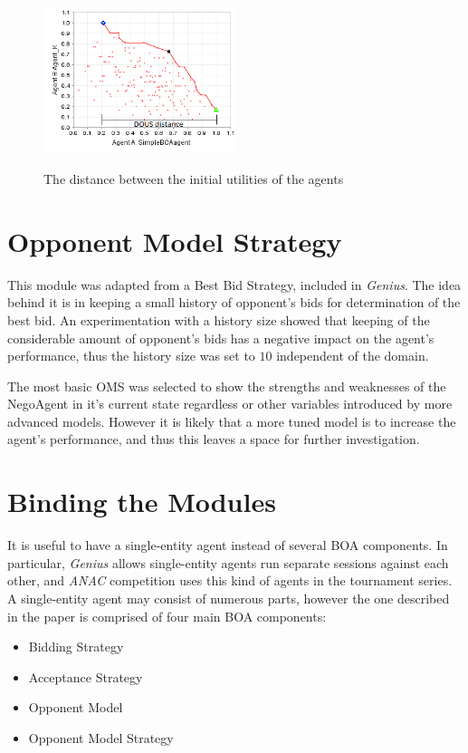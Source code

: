 \documentclass[html]{report}    %
\begin{document}
\begin{figure}[htbp]
  \caption{The distance between the initial utilities of the agents}
  \centering
    \includegraphics[width=0.5\textwidth]{dous}
    \label{3}
\end{figure}

\section{Opponent Model Strategy}  

This module was adapted from a Best Bid Strategy, included in \textit{Genius}. The idea behind it is in keeping a small history of opponent's bids for determination of the best bid. An experimentation with a history size showed that keeping of the considerable amount of opponent's bids has a negative impact on the agent's performance, thus the history size was set to $10$ independent of the domain.

The most basic OMS was selected to show the strengths and weaknesses of the NegoAgent in it's current state regardless or other variables introduced by more advanced models. However it is likely that a more tuned model is to increase the agent's performance, and thus this leaves a space for further investigation.

\section{Binding the Modules}

It is useful to have a single-entity agent instead of several BOA components. In particular, \textit{Genius} allows single-entity agents run separate sessions against each other, and \textit{ANAC} competition uses this kind of agents in the tournament series. A single-entity agent may consist of numerous parts, however the one described in the paper is comprised of four main BOA components:
\begin{itemize}
	\item Bidding Strategy
	\item Acceptance Strategy
	\item Opponent Model
	\item Opponent Model Strategy
\end{itemize}
\end{document}

